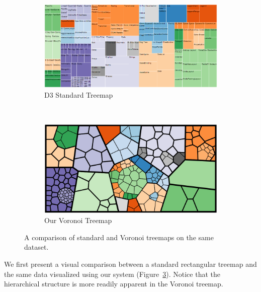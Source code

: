 \documentclass{acm_proc_article-sp} \usepackage{cite}
\begin{document}
\begin{figure}
        \centering
        \begin{subfigure}[b]{0.45\textwidth}
                \includegraphics[width=\textwidth]{source-images/d3-treemap-flare.png}
                \caption{D3 Standard Treemap}
                \label{fig:treemapflare}
        \end{subfigure}%
        ~ %
	\qquad
        \begin{subfigure}[b]{0.45\textwidth}
                \includegraphics[width=\textwidth]{source-images/voronoi-flare-960-500-cropped.png}
                \caption{Our Voronoi Treemap}
                \label{fig:voronoiflare}
        \end{subfigure}
        \caption{A comparison of standard and Voronoi treemaps on the same dataset.}\label{fig:comparestandard}
\end{figure}


We first present a visual comparison between a standard rectangular treemap and the
same data visualized using our system (Figure~\ref{fig:comparestandard}).
Notice that the hierarchical structure is more readily
apparent in the Voronoi treemap.
\end{document}
